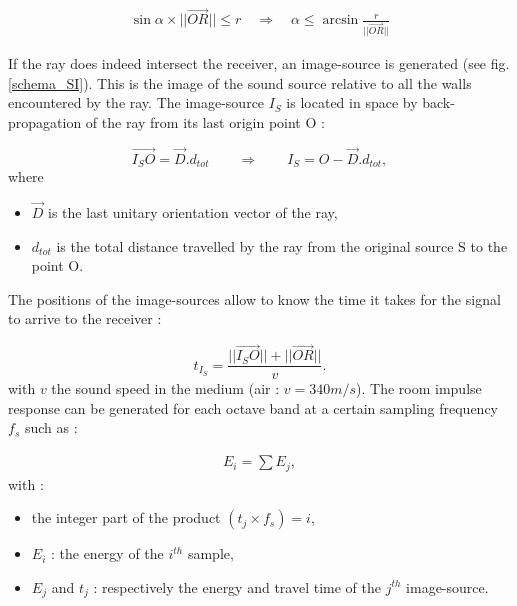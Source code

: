 \documentclass[AMA,STIX1COL]{WileyNJD-v2}
\begin{document}
\begin{align}
\sin{\alpha} \times ||\overrightarrow{OR}||  \leqslant r 
\quad \Rightarrow \quad
\alpha  \leqslant \arcsin{\frac{r}{||\overrightarrow{OR}||}}
\end{align}

If the ray does indeed intersect the receiver, an image-source is generated (see fig. \ref{schema_SI}). This is the image of the sound source relative to all the walls encountered by the ray. The image-source $I_S$ is located in space by back-propagation of the ray from its last origin point O :

\begin{equation}
\overrightarrow{I_S O} = \overrightarrow{D}.d_{tot} \qquad \Rightarrow \qquad I_S = O - \overrightarrow{D}.d_{tot},
\end{equation}
where 
\begin{itemize}
\item $\overrightarrow{D}$ is the last unitary orientation vector of the ray,
\item $d_{tot}$ is the total distance travelled by the ray from the original source S to the point O.
\end{itemize}


The positions of the image-sources allow to know the time it takes for the signal to arrive to the receiver :

\begin{equation}
t_{I_S} = \frac{||\overrightarrow{I_S O}|| + ||\overrightarrow{OR}||}{v}.
\end{equation}
with $v$ the sound speed in the medium (air : $v=340m/s$). The room impulse response can be generated for each octave band at a certain sampling frequency $f_s$ such as :

\begin{align}
E_{i} =  \sum{E_j},
\end{align}
with : 
\begin{itemize}
\item  the integer part of the product $(t_j \times f_s) = i$,
\item$E_{i}$ : the energy of the $i^{th}$ sample,
\item$E_j$ and $t_j$ : respectively the energy and travel time of the $j^{th}$ image-source.
\end{itemize}
\end{document}
